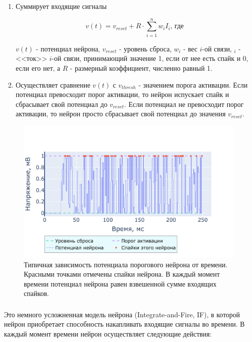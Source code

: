 \documentclass[a4paper]{article}
\begin{document}
\begin{enumerate}
 \item Суммирует входящие сигналы

\begin{equation} \label{eq:thresh}
v(t) = v_{reset} + R \cdot \sum_{i=1}^n {w_i I_i} \text{, где}
\end{equation}

$v(t)$ - потенциал нейрона, $v_{reset}$ - уровень сброса, $w_i$ - вес $i$-ой связи, $_i$ - <<ток>> $i$-ой связи, принимающий значение 1, если от нее есть спайк и 0, если его нет, а $R$ - размерный коэффициент, численно равный 1.

\item Осуществляет сравнение $v(t)$ с $v_{thresh}$ - значением порога активации. Если потенциал превосходит порог активации, то нейрон испускает спайк и сбрасывает свой потенциал до $v_{reset}$. Если потенциал не превосходит порог активации, то нейрон просто сбрасывает свой потенциал до значения $v_{reset}$.
\end{enumerate}

\begin{center}
\begin{figure}[H] 
 \includegraphics[width=\textwidth,keepaspectratio=true]{model_thresh_ru.pdf}
 \caption{Типичная зависимость потенциала порогового нейрона от времени. Красными точками отмечены спайки нейрона. В каждый момент времени потенциал нейрона равен взвешенной сумме входящих спайков.}
\end{figure}
\end{center}

\subsubsection{}
Это немного усложненная модель нейрона (Integrate-and-Fire, IF), в которой нейрон приобретает способность накапливать входящие сигналы во времени. В каждый момент времени нейрон осуществляет следующие действия:
\end{document}
